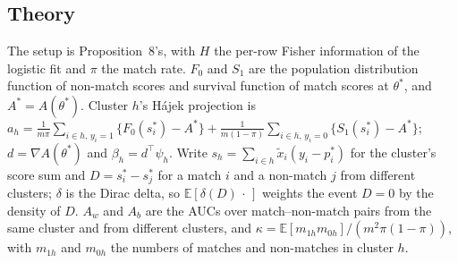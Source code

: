 \documentclass[11pt]{amsart}
\theoremstyle{plain}
\theoremstyle{definition}
\theoremstyle{remark}
\newcommand{\E}{\mathbb{E}}
\begin{document}
\subsection{Theory}
The setup is Proposition~8's, with $H$ the per-row Fisher information of the logistic fit and $\pi$ the match rate. $F_0$ and $S_1$ are the population distribution function of non-match scores and survival function of match scores at $\theta^*$, and $A^*=A(\theta^*)$. Cluster $h$'s H\'ajek projection is $a_h=\frac{1}{m\pi}\sum_{i\in h,\,y_i=1}\{F_0(s^*_i)-A^*\}+\frac{1}{m(1-\pi)}\sum_{i\in h,\,y_i=0}\{S_1(s^*_i)-A^*\}$; $d=\nabla A(\theta^*)$ and $\beta_h=d^\top\psi_h$. Write $s_h=\sum_{i\in h}\tilde x_i(y_i-p^*_i)$ for the cluster's score sum and $D=s^*_i-s^*_j$ for a match $i$ and a non-match $j$ from different clusters; $\delta$ is the Dirac delta, so $\E[\delta(D)\,\cdot\,]$ weights the event $D=0$ by the density of $D$. $A_w$ and $A_b$ are the AUCs over match--non-match pairs from the same cluster and from different clusters, and $\kappa=\E[m_{1h}m_{0h}]/(m^2\pi(1-\pi))$, with $m_{1h}$ and $m_{0h}$ the numbers of matches and non-matches in cluster $h$.
\end{document}
